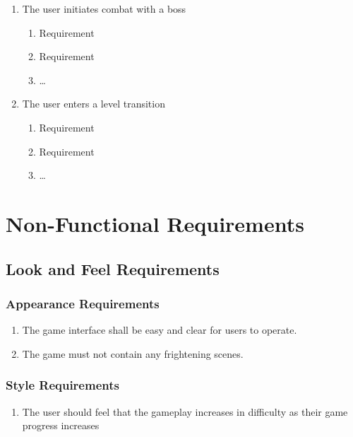\documentclass[12pt, titlepage]{article}
\begin{document}
\begin{enumerate}[{VP}1.]
\begin{enumerate}[{BE1}.1]
    \item The user initiates combat with a boss
    \begin{enumerate}
      \item Requirement
      \item Requirement
      \item \dots
    \end{enumerate}
    \item The user enters a level transition
    \begin{enumerate}
      \item Requirement
      \item Requirement
      \item \dots
    \end{enumerate}
  \end{enumerate}
\end{enumerate}

\section{Non-Functional Requirements}
\label{sec:non-functional_requirements}
\subsection{Look and Feel Requirements}
\label{sub:look_and_feel_requirements}

\subsubsection{Appearance Requirements}
\label{ssub:appearance_requirements}
\begin{enumerate}[{LF}1. ]
        \item The game interface shall be easy and clear for users to operate.
        \item The game must not contain any frightening scenes.
\end{enumerate}

\subsubsection{Style Requirements}
\label{ssub:style_requirements}
\begin{enumerate}[{LF}3. ]
        \item The user should feel that the gameplay increases in difficulty as their game progress increases
\end{enumerate}
\end{document}
